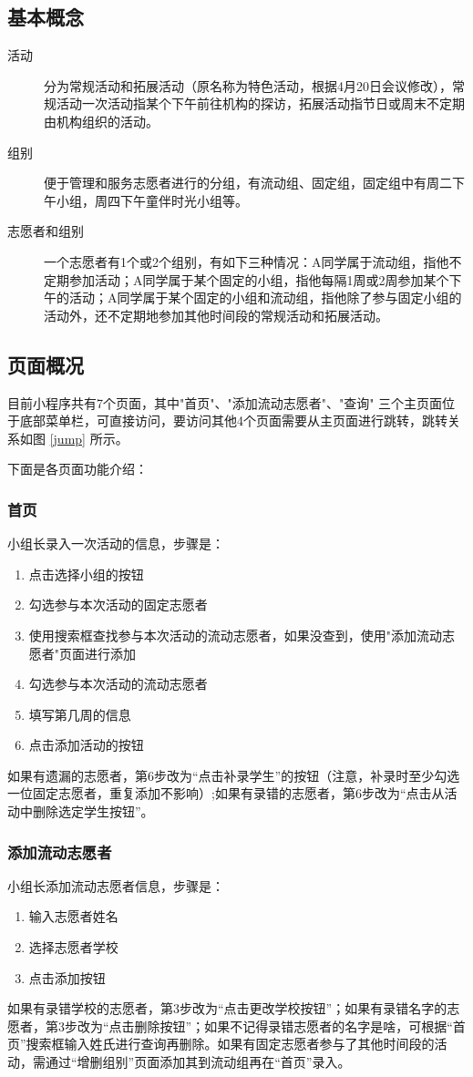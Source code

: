 \documentclass[]{ctexart}
\begin{document}
\subsection{基本概念}
\begin{description}
\item[活动]  分为常规活动和拓展活动（原名称为特色活动，根据4月20日会议修改），常规活动一次活动指某个下午前往机构的探访，拓展活动指节日或周末不定期由机构组织的活动。
\item[组别]  便于管理和服务志愿者进行的分组，有流动组、固定组，固定组中有周二下午小组，周四下午童伴时光小组等。
\item[志愿者和组别] 一个志愿者有1个或2个组别，有如下三种情况：A同学属于流动组，指他不定期参加活动；A同学属于某个固定的小组，指他每隔1周或2周参加某个下午的活动；A同学属于某个固定的小组和流动组，指他除了参与固定小组的活动外，还不定期地参加其他时间段的常规活动和拓展活动。
\end{description}
\subsection{页面概况}
目前小程序共有7个页面，其中"首页"、"添加流动志愿者"、"查询" 三个主页面位于底部菜单栏，可直接访问，要访问其他4个页面需要从主页面进行跳转，跳转关系如图 \ref{jump} 所示。

下面是各页面功能介绍：

\subsubsection{首页}
小组长录入一次活动的信息，步骤是：
\begin{enumerate}
\item 点击选择小组的按钮
\item 勾选参与本次活动的固定志愿者
\item 使用搜索框查找参与本次活动的流动志愿者，如果没查到，使用"添加流动志愿者"页面进行添加
\item 勾选参与本次活动的流动志愿者
\item 填写第几周的信息
\item 点击添加活动的按钮
\end{enumerate}
如果有遗漏的志愿者，第6步改为“点击补录学生”的按钮（注意，补录时至少勾选一位固定志愿者，重复添加不影响）;如果有录错的志愿者，第6步改为“点击从活动中删除选定学生按钮”。

\subsubsection{添加流动志愿者}
小组长添加流动志愿者信息，步骤是：
\begin{enumerate}
\item  输入志愿者姓名
\item 选择志愿者学校
\item 点击添加按钮
\end{enumerate}
如果有录错学校的志愿者，第3步改为“点击更改学校按钮”；如果有录错名字的志愿者，第3步改为“点击删除按钮”；如果不记得录错志愿者的名字是啥，可根据“首页”搜索框输入姓氏进行查询再删除。如果有固定志愿者参与了其他时间段的活动，需通过“增删组别”页面添加其到流动组再在“首页”录入。
\end{document}
